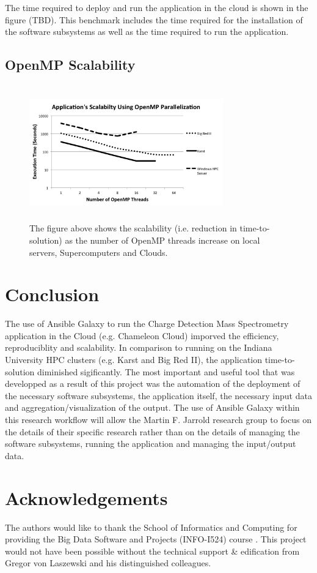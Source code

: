 \documentclass[9pt,twocolumn,twoside]{styles/osajnl}
\begin{document}
The time required to deploy and run the application in the cloud is
shown in the figure (TBD). This benchmark includes the time required
for the installation of the software subsystems as well as the time
required to run the application. 

\subsection{OpenMP Scalability} \label{scalability}
\begin{figure}
\centering
\includegraphics[height=2.3in, width=3.3in]{images/scalability2}
\caption{The figure above shows the scalability (i.e. reduction in time-to-solution) as the number of OpenMP threads increase on local servers, Supercomputers and Clouds.}
\label{fig:scalability2}
\end{figure}

\section{Conclusion} \label{conclusion}
The use of Ansible Galaxy to run the Charge Detection Mass
Spectrometry application in the Cloud (e.g. Chameleon Cloud) imporved
the efficiency, reproduciblity and scalability. In comparison to
running on the Indiana University HPC clusters (e.g. Karst and Big Red
II), the application time-to-solution diminished sigificantly. The
most important and useful tool that was developped as a result of this
project was the automation of the deployment of the necessary software
subsystems, the application itself, the necessary input data and
aggregation/visualization of the output. The use of Ansible Galaxy
within this research workflow will allow the Martin F. Jarrold
research group to focus on the details of their specific research
rather than on the details of managing the software subsystems,
running the application and managing the input/output data.

\section*{Acknowledgements}
The authors would like to thank the School of Informatics and
Computing for providing the Big Data Software and Projects (INFO-I524)
course \cite{www-i524}. This project would not have been possible
without the technical support \& edification from Gregor von Laszewski
and his distinguished colleagues.
\end{document}
